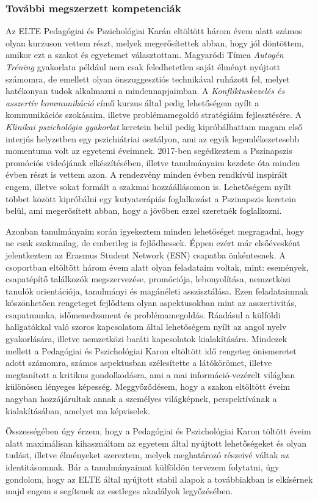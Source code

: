 \subsubsection*{További megszerzett kompetenciák}

\par Az ELTE Pedagógiai és Pszichológiai Karán eltöltött három évem alatt számos olyan kurzuson vettem részt, melyek megerősítettek abban, hogy jól döntöttem, amikor ezt a szakot és egyetemet választottam. Magyaródi Tímea \textit{Autogén Tréning } gyakorlata például nem csak feledhetetlen saját élményt nyújtott számomra, de emellett olyan önszuggesztiós technikával ruházott fel, melyet hatékonyan tudok alkalmazni a mindennapjaimban. A \textit{Konfliktuskezelés és asszertív kommunikáció} című kurzus által pedig lehetőségem nyílt a kommunikációs szokásaim, illetve problémamegoldó stratégiáim fejlesztésére. A \textit{Klinikai pszichológia gyakorlat} keretein belül pedig kipróbálhattam magam első interjús helyzetben egy pszichiátriai osztályon, ami az egyik legemlékezetesebb momentuma volt az egyetemi éveimnek. 2017-ben segédkeztem a Pszinapszis promóciós videójának elké\-szítésében, illetve tanulmányaim kezdete óta minden évben részt is vettem azon. A rendezvény minden évben rendkívül inspirált engem, illetve sokat formált a szakmai hozzáállásomon is. Lehetőségem nyílt többet között kipróbálni egy kutyaterápiás foglalkozást a Pszinapszis keretein belül, ami megerősített abban, hogy a jövőben ezzel szeretnék foglalkozni. \pagebreak

Azonban tanulmányaim során igyekeztem minden lehetőséget megragadni, hogy ne csak szakmailag, de emberileg is fejlődhessek. Éppen ezért már elsőévesként jelentkeztem az Erasmus Student Network (ESN) csapatba önkéntesnek. A csoportban eltöltött három évem alatt olyan feladataim voltak, mint: események, csapatépítő találkozók megszervezése, promóciója, lebonyolítása, nemzetközi tanulók orientációja, tanulmányi és magánéleti asszisztálása. Ezen feladataimnak köszönhetően rengeteget fejlődtem olyan aspektusokban mint az asszertivitás, csapatmunka, időmenedzsment és problémamegoldás. Ráadásul a külföldi hallgatókkal való szoros kapcsolatom által lehetőségem nyílt az angol nyelv gyakorlására, illetve nemzetközi baráti kapcsolatok kialakítására. Mindezek mellett a Pedagógiai és Pszichológiai Karon eltöltött idő rengeteg önismeretet adott számomra, számos aspektusban szélesítette a látókörömet, illetve megtanított a kritikus gondolkodásra, ami a mai információ-vezérelt világban különösen lényeges képesség. Meggyőződésem, hogy a szakon eltöltött éveim nagyban hozzájárultak annak a személyes világképnek, perspektívának a kialakításában, amelyet ma képviselek.  
\\
\par Összességében úgy érzem, hogy a Pedagógiai és Pszichológiai Karon töltött éveim alatt maximálisan kihasználtam az egyetem által nyújtott lehetőségeket és olyan tudást, illetve élményeket szereztem, melyek meghatározó részeivé váltak az identitásomnak. Bár a tanulmányaimat külföldön tervezem folytatni, úgy gondolom, hogy az ELTE által nyújtott stabil alapok a továbbiakban is elkísérnek majd engem s segítenek az esetleges akadályok legyőzésében.